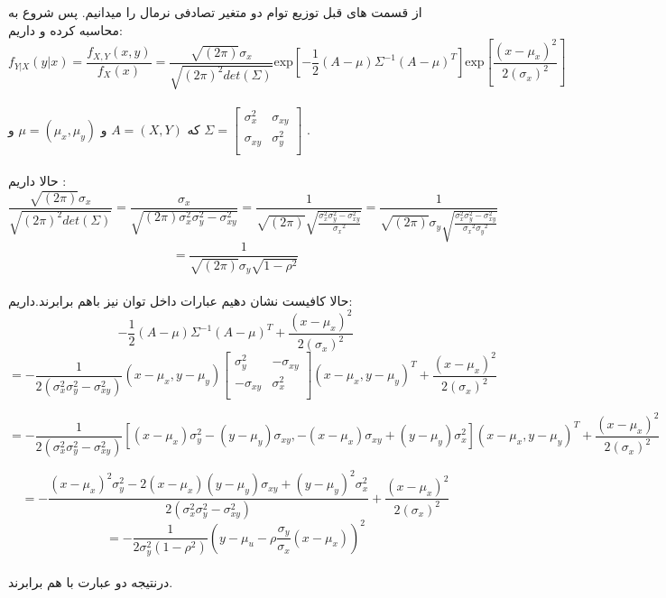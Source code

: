 \parte{}
از قسمت های قبل توزیع توام دو متغیر تصادفی نرمال را میدانیم.
پس شروع به محاسبه کرده و داریم:\\
\[
f_{Y|X}(y|x) = \frac{f_{X,Y}(x,y)}{f_X(x)} = 
\frac{\sqrt{(2\pi)}\sigma_{x}}{\sqrt{(2\pi)^2 det(\Sigma)}} 
\text{exp}[-\frac{1}{2}{(A - \mu)}{\Sigma}^{-1}(A - \mu)^{T}]
\text{exp}[\frac{(x - \mu_x)^2}{2(\sigma_{x})^2}]
\]\\
که $A = (X,Y)$ و $\mu = (\mu_x,\mu_y)$ و $\Sigma =\begin{bmatrix}
    \sigma_{x}^2 & \sigma_{xy} \\
    \sigma_{xy} & \sigma_{y}^2 \\
\end{bmatrix}$ .\\\\
حالا داریم :\\
\[ 
    \frac{\sqrt{(2\pi)}\sigma_{x}}{\sqrt{(2\pi)^2 det(\Sigma)}} =
    \frac{\sigma_{x}}{\sqrt{(2\pi) \sigma_{x}^2\sigma_{y}^2-\sigma_{xy}^2}} =
    \frac{1}{\sqrt{(2\pi)} \sqrt{\frac{\sigma_{x}^2\sigma_{y}^2-\sigma_{xy}^2}{{\sigma_x}^2}}} =
    \frac{1}{\sqrt{(2\pi)} \sigma_y \sqrt{\frac{\sigma_{x}^2\sigma_{y}^2-\sigma_{xy}^2}{{\sigma_x}^2{\sigma_y}^2}}}
\]
\[ 
    = \frac{1}{\sqrt{(2\pi)} \sigma_y \sqrt{1-\rho^2}}
\]\\
حالا کافیست نشان دهیم عبارات داخل توان نیز باهم برابرند.داریم:\\
\[
    -\frac{1}{2}{(A - \mu)}{\Sigma}^{-1}(A - \mu)^{T}+\frac{(x - \mu_x)^2}{2(\sigma_{x})^2}
\]
\[
    = -\frac{1}{2(\sigma_x^2\sigma_y^2 - \sigma_{xy}^2)}{(x-\mu_x,y-\mu_y)}
    \begin{bmatrix}
        \sigma_{y}^2 & -\sigma_{xy} \\
        -\sigma_{xy} & \sigma_{x}^2 \\
    \end{bmatrix}
    (x-\mu_x,y-\mu_y)^{T}+\frac{(x - \mu_x)^2}{2(\sigma_{x})^2}
\]

\[
    = -\frac{1}{2(\sigma_x^2\sigma_y^2 - \sigma_{xy}^2)}
    [(x-\mu_x)\sigma_y^2-(y-\mu_y)\sigma_{xy},-(x-\mu_x)\sigma_{xy}+(y-\mu_y)\sigma_{x}^2]
    (x-\mu_x,y-\mu_y)^{T}+\frac{(x - \mu_x)^2}{2(\sigma_{x})^2}
\]

\[
    = -\frac{(x-\mu_x)^2\sigma_y^2-2(x-\mu_x)(y-\mu_y)\sigma_{xy}+(y-\mu_y)^2\sigma_{x}^2}{2(\sigma_x^2\sigma_y^2 - \sigma_{xy}^2)}
    +\frac{(x - \mu_x)^2}{2(\sigma_{x})^2}
\]
\[
=-\frac{1}{2\sigma_y^2(1-\rho^2)}(y-\mu_u-\rho\frac{\sigma_y}{\sigma_x}(x-\mu_x))^2    
\]
\\
درنتیجه دو عبارت با هم برابرند.\\
\parte{}
\parte{}